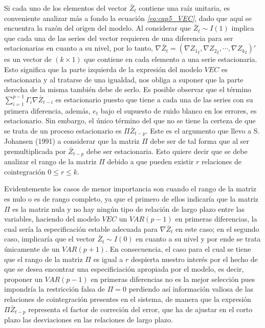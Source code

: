 Si cada uno de los elementos del vector $\bar{Z}_t$ contiene una raíz unitaria, es conveniente analizar más a fondo la ecuación \textit{\ref{eq:cap5_VEC}}, dado que aquí se encuentra la razón del origen del modelo. Al considerar que $\bar{Z}_t\sim I(1)$ implica que cada una de las series del vector requieren de una diferencia para ser estacionarias en cuanto a su nivel, por lo tanto, $\nabla \bar{Z}_t = \left (  \nabla {Z_1}_t, \nabla {Z_2}_t, \cdots, \nabla {Z_k}_t\right )'$  es un vector de $(k \times 1)$ que contiene en cada elemento a una serie estacionaria.  Esto significa que la parte izquierda de la expresión del modelo $VEC$ es estacionaria y al tratarse de una igualdad, nos obliga a suponer que la parte derecha de la misma también debe de serlo.  Es posible observar que el término $\sum_{i=1}^{p-1}\Gamma_i\nabla\bar{Z}_{t-i} $ es estacionario puesto que tiene a cada una de las series con su primera diferencia, además, $e_t$ bajo el supuesto de ruido blanco en los errores, es estacionario. Sin embargo,  el único término del que no se tiene la certeza de que se trata de un proceso estacionario es $\Pi\bar{Z}_{t-p}$. Este es el argumento que llevo a S. Johansen (1991) a considerar que la matriz $\Pi$ debe ser de tal forma que al ser premultiplicada por $\bar{Z}_{t-p}$ debe ser estacionaria. Esto quiere decir que se debe analizar el rango de la matriz $\Pi$ debido a que pueden existir $r$ relaciones de cointegración $0\leq r \leq k$.\bigskip 

 Evidentemente los casos de menor importancia son cuando el rango de la matriz es nulo o es de rango completo, ya que el primero de ellos indicaría que la matriz $\Pi$ es la matriz nula y no hay ningún tipo de relación de largo plazo entre las variables, haciendo del modelo $VEC$ un $VAR(p-1)$ en primeras diferencias, la cual sería la especificación estable adecuada para $\nabla \bar{Z}_t$ en este caso; en el segundo caso, implicaría que el vector $\bar{Z}_t\sim I(0)$ en cuanto a su nivel y por ende  se trata únicamente de un $VAR(p+1)$. En consecuencia, el caso para el cual se tiene que el rango de la matriz $\Pi$ es igual a $r$ despierta nuestro interés por el hecho de que se desea encontrar una especificiación apropiada por el modelo, es decir, proponer un   $VAR(p-1)$  en primeras diferencias no es la mejor selección pues impondría la restricción falsa de $\Pi=0$ perdiendo así información valiosa de las relaciones de cointegración presentes en el sistema, de manera que la expresión $\Pi\bar{Z}_{t-p}$ representa el factor de correción del error, que ha de ajustar en el corto plazo las desviaciones en las relaciones de largo plazo.\bigskip 
 
